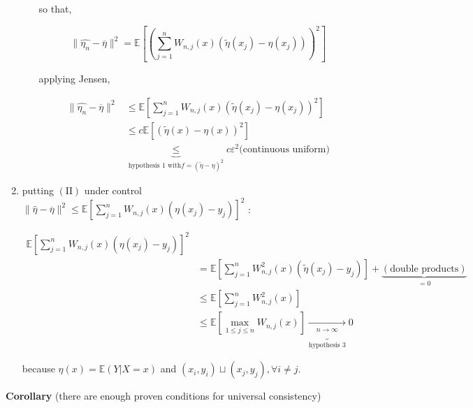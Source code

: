 \begin{enumerate}[1.]
\begin{enumerate}[(a)]
						so that,
			
						\[
							\|\hat{{\eta}_n} - \overline{\eta} \|^2 = \mathbb{E}[(\sum_{j=1}^{n}W_{n,j}(x)(\tilde{\eta}(x_j) - \eta(x_j)))^2]
						\]

						applying Jensen,

						  \begin{align*}
				            \|\hat{{\eta}_n} - \overline{\eta} \|^2  & \leq \mathbb{E}[\sum_{j=1}^{n}W_{n,j}(x)(\tilde{\eta}(x_j) - \eta(x_j))^2] \\
										 & \leq c\mathbb{E}[(\tilde{\eta}(x) - \eta(x))^2] \\
										 & \underbrace{\leq}_{\text{hypothesis 1 with} f = (\tilde{\eta} - \eta)^2} c{\varepsilon}^2 \text{(continuous uniform)}
						  \end{align*}

					\end{enumerate}
					
				\item putting $\mathrm{(II)}$ under control $\|\hat{\eta} - \overline{\eta} \|^2 \leq \mathbb{E}[\sum_{j=1}^{n}W_{n,j}(x)({\eta}(x_j) - y_j)]^2$ : 

						  \begin{align*}
				            \mathbb{E}[\sum_{j=1}^{n}W_{n,j}(x)({\eta}(x_j) - y_j)]^2  &  \\
										 & = \mathbb{E}[\sum_{j=1}^{n}W_{n,j}^2(x)(\tilde{\eta}(x_j) - y_j)] + \underbrace{(\text{double products})}_{= 0}\\
										 & \leq \mathbb{E}[\sum_{j=1}^{n}W_{n,j}^2(x)] \\
										 & \leq \mathbb{E}[\underset{1\leq j \leq n}{\operatorname{max}} W_{n,j}(x)] \underbrace{\xrightarrow[n\to \infty]{}}_{\text{hypothesis 3}} 0
						  \end{align*}

							because $\eta(x) = \mathbb{E}(Y|X=x)$ and $(x_i,y_i) \sqcup (x_j,y_j), \forall i \neq j$.

			\end{enumerate}

		\textbf{Corollary} (there are enough proven conditions for universal consistency)

